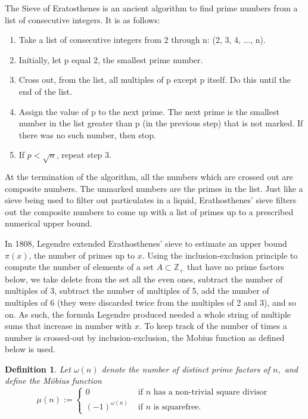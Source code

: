 \documentclass[11pt]{article}
\newtheorem{definition}[theorem]{Definition}
\theoremstyle{definition}
\begin{document}

The Sieve of Eratosthenes is an ancient algorithm to find prime numbers from a list of consecutive integers. It is as follows:

\begin{enumerate}
    \item Take a list of consecutive integers from 2 through n: (2, 3, 4, ..., n).
    \item Initially, let p equal 2, the smallest prime number.
    \item Cross out, from the list, all multiples of p except p itself. Do this until the end of the list.
    \item Assign the value of p to the next prime. The next prime is the smallest number in the list greater than p (in the previous step) that is not marked. If there was no such number, then stop. 
    \item If $p < \sqrt{n}$, repeat step 3.
\end{enumerate}

At the termination of the algorithm, all the numbers which are crossed out are composite numbers. The unmarked numbers are the primes in the list. Just like a sieve being used to filter out particulates in a liquid, Erathosthenes' sieve filters out the composite numbers to come up with a list of primes up to a prescribed numerical upper bound.\cite{Mollin} 

In 1808, Legendre extended Erathosthenes' sieve to estimate an upper bound $\pi(x)$, the number of primes up to $x$. Using the inclusion-exclusion principle to compute the number of elements of a set $A \subset \mathbb{Z}_+$ that have no prime factors below, we take delete from the set all the even ones, subtract the number of multiples of 3, subtract the number of multiples of 5, add the number of multiples of 6 (they were discarded twice from the multiples of 2 and 3), and so on. As such, the formula Legendre produced needed a whole string of multiple sums that increase in number with $x$. To keep track of the number of times a number is crossed-out by inclusion-exclusion, the Mobius function as defined below is used.

\begin{definition}
Let $\omega(n)$ denote the number of distinct prime factors of $n,$ and define the Möbius function
$$
\mu(n):=\left\{\begin{array}{ll}
0 & \text { if } n \text { has a non-trivial square divisor } \\
(-1)^{\omega(n)} & \text { if } n \text { is squarefree. }
\end{array}\right.
$$
\end{definition}
\end{document}
